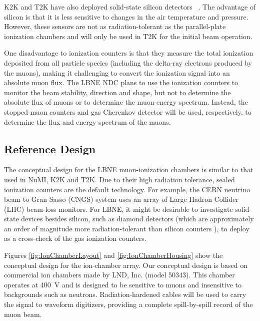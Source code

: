 K2K and T2K have also
deployed solid-state silicon detectors~\cite{ref:Maruyama}
\cite{ref:RD42A}. The advantage of silicon is that it is less
sensitive to changes in the air temperature and pressure. However, these %
sensors are not as radiation-tolerant as the parallel-plate ionization 
chambers and will only be used in T2K for the initial
beam operation. 

One disadvantage to ionization counters is that they
measure the total ionization deposited from all particle species
(including the delta-ray electrons produced by the muons), making it
challenging to convert the ionization signal into an absolute
muon flux. The LBNE NDC plans to use the ionization counters to monitor
the beam stability, direction and shape, 
but not to determine the
absolute flux of muons or to determine the muon-energy spectrum. Instead, the
stopped-muon counters %
and gas Cherenkov detector %
 will be used, respectively, to determine the flux and energy
spectrum of the muons. 

\subsection{Reference Design}

The conceptual design for the LBNE muon-ionization chambers is similar
to that used in NuMI, K2K and T2K.  Due to their high radiation
tolerance, sealed ionization counters are the default technology.  For
example, the CERN neutrino beam to Gran Sasso (CNGS) 
system uses an array of Large Hadron Collider (LHC) 
 beam-loss monitors. For LBNE, it might be desirable to investigate solid-state devices
besides silicon, such as diamond detectors (which are approximately an
order of magnitude more radiation-tolerant than silicon counters
\cite{ref:RD42A}\cite{ref:K2KMuDecayMon} ), to deploy as a cross-check of the gas
ionization counters.

Figures \ref{fig:IonChamberLayout} and \ref{fig:IonChamberHousing}
show the conceptual design for the ion-chamber array. Our conceptual
design is based on commercial ion chambers made by LND, Inc. (model 50343). 
This chamber operates at 400~V and is designed to be sensitive to muons and insensitive to 
backgrounds such as neutrons. 
Radiation-hardened cables will be used to carry the signal to waveform
digitizers, providing a complete spill-by-spill record of the
muon beam.

